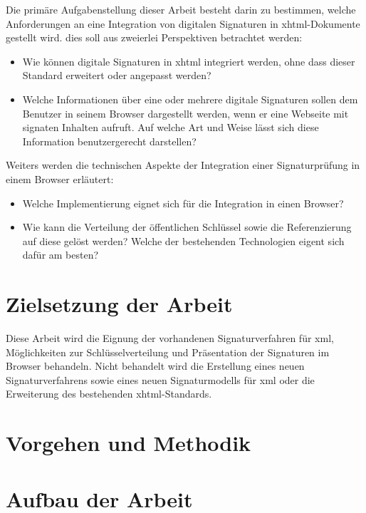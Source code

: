 Die primäre Aufgabenstellung dieser Arbeit besteht darin zu bestimmen, welche Anforderungen an eine Integration von digitalen Signaturen in \gls{xhtml}-Dokumente gestellt wird. dies soll aus zweierlei Perspektiven betrachtet werden:
\begin{itemize}
    \item Wie können digitale Signaturen in \gls{xhtml} integriert werden, ohne dass dieser Standard erweitert oder angepasst werden?
    \item Welche Informationen über eine oder mehrere digitale Signaturen sollen dem Benutzer in seinem Browser dargestellt werden, wenn er eine Webseite mit signaten Inhalten aufruft. Auf welche Art und Weise lässt sich diese Information benutzergerecht darstellen?
\end{itemize}
Weiters werden die technischen Aspekte der Integration einer Signaturprüfung in einem Browser erläutert:
\begin{itemize}
    \item Welche Implementierung eignet sich für die Integration in einen Browser?
    \item Wie kann die Verteilung der öffentlichen Schlüssel sowie die Referenzierung auf diese gelöst werden? Welche der bestehenden Technologien eigent sich dafür am besten?
\end{itemize}

\section{Zielsetzung der Arbeit}
%
\label{sec:einl:ziele}%
Diese Arbeit wird die Eignung der vorhandenen Signaturverfahren für \gls{xml}, Möglichkeiten zur Schlüsselverteilung und Präsentation der Signaturen im Browser behandeln.
Nicht behandelt wird die Erstellung eines neuen Signaturverfahrens sowie eines neuen Signaturmodells für \gls{xml} oder die Erweiterung des bestehenden \gls{xhtml}-Standards.

\section{Vorgehen und Methodik}
%
\label{sec:einl:methodik}%


\section{Aufbau der Arbeit}
%
\label{sec:einl:aufbau}%
